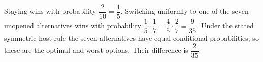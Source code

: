 Staying wins with probability $\dfrac{2}{10}=\dfrac{1}{5}$. Switching uniformly to one of the seven unopened alternatives wins with probability $\dfrac{1}{5}\cdot\dfrac{1}{7}+\dfrac{4}{5}\cdot\dfrac{2}{7}=\dfrac{9}{35}$. Under the stated symmetric host rule the seven alternatives have equal conditional probabilities, so these are the optimal and worst options. Their difference is $\boxed{\dfrac{2}{35}}$.
